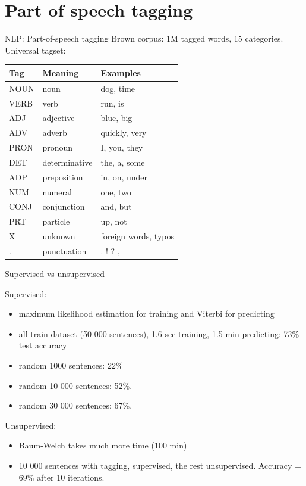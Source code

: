 \documentclass{beamer}
\begin{document}
\section{Part of speech tagging}
\begin{frame}{NLP: Part-of-speech tagging}
    Brown corpus: 1M tagged words, 15 categories.
    Universal tagset:
    \begin{table}[h]
        \centering
        \begin{tabular}{lll}
            \toprule
            \textbf{Tag} & \textbf{Meaning} & \textbf{Examples} \\
            \midrule
            NOUN & noun & dog, time \\
            VERB & verb & run, is \\
            ADJ & adjective & blue, big \\
            ADV & adverb & quickly, very \\
            PRON & pronoun & I, you, they \\
            DET & determinative & the, a, some \\
            ADP & preposition & in, on, under \\
            NUM & numeral & one, two \\
            CONJ & conjunction & and, but \\
            PRT & particle & up, not \\
            X & unknown & foreign words, typos \\
            . & punctuation & . ! ? , \\
            \bottomrule
        \end{tabular}
    \end{table}
\end{frame}
\begin{frame}{Supervised vs unsupervised}

Supervised: 
\begin{itemize}
    \item maximum likelihood estimation for training and Viterbi for predicting 
    \item all train dataset (\~50 000 sentences), 1.6 sec training, 1.5 min predicting: 73\% test accuracy
    \item random 1000 sentences: 22\%
    \item random 10 000 sentences: 52\%.
    \item random 30 000 sentences: 67\%.
\end{itemize}
Unsupervised:
\begin{itemize}
    \item Baum-Welch takes much more time (100 min)
    \item 10 000 sentences with tagging, supervised, the rest unsupervised. Accuracy = 69\% after 10 iterations.
\end{itemize}
\end{frame}
\end{document}
